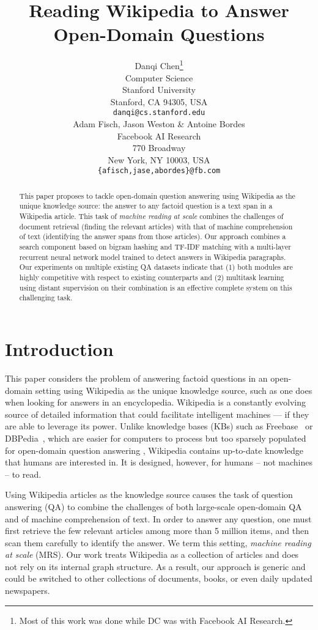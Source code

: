 \documentclass[11pt,a4paper]{article}
\title{Reading Wikipedia to Answer Open-Domain Questions}
\author{Danqi Chen\thanks{\hspace{0.3em} Most of this work was done while DC was with Facebook AI Research.} \\
Computer Science\\ 
Stanford University\\
Stanford, CA 94305, USA\\
  {\tt danqi@cs.stanford.edu} \\\And
Adam Fisch, Jason Weston \& Antoine Bordes\\
Facebook AI Research\\
770 Broadway\\
New York, NY 10003, USA\\
{\tt \{afisch,jase,abordes\}@fb.com} \\}
\date{}
\begin{document}
\maketitle
\begin{abstract}
This paper proposes to tackle open-domain question answering using Wikipedia as the unique knowledge source: the answer to any factoid question is a text span in a Wikipedia article. This task of {\it machine reading at scale} combines the challenges of document retrieval (finding the relevant articles) with that of machine comprehension of text (identifying the answer spans from those articles). Our approach combines a search component based on bigram hashing and TF-IDF matching  with a multi-layer recurrent neural network model trained to detect answers in Wikipedia paragraphs. Our experiments on multiple existing QA datasets indicate that (1) both modules are highly competitive with respect to existing counterparts and (2) multitask learning using distant supervision on their combination is an effective complete system on this challenging task.
\end{abstract}

\section{Introduction}

This paper considers the problem of answering factoid questions in an open-domain setting using Wikipedia as the unique knowledge source, such as one does when looking for answers in an encyclopedia.
Wikipedia is a constantly evolving source of detailed information that could facilitate intelligent machines  --- if they are able to leverage its power.
Unlike knowledge bases (KBs) such as Freebase~\cite{bollacker2008freebase} or DBPedia~\cite{auer2007dbpedia}, which are easier for computers to process but too sparsely populated for open-domain question answering \cite{miller2016key}, Wikipedia contains up-to-date knowledge that humans are interested in. It is designed, however, for humans -- not machines -- to read.


Using Wikipedia articles as the knowledge source causes the task of question answering (QA) to combine the challenges of both large-scale open-domain QA and of machine comprehension of text. In order to answer any question, one must first retrieve the few relevant articles among more than 5 million items, and then scan them carefully to identify the answer.
We term this setting, {\it machine reading at scale} (MRS).
Our work treats Wikipedia as a collection of articles and does not rely on its internal graph structure. As a result, our approach is generic and could be switched to other collections of documents, books, or even daily updated newspapers.
\end{document}
